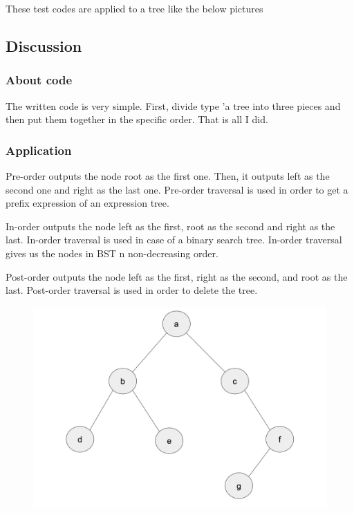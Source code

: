 \documentclass[uplatex,12pt]{jsarticle}
\begin{document}
These test codes are applied to a tree like the below pictures

\vspace{12pt}
\subsection{Discussion}

\subsubsection{About code}
The written code is very simple. First, divide type 'a tree into three pieces and then put them together in the specific order. That is all I did.
\subsubsection{Application}

Pre-order outputs the node root as the first one. Then, it outputs left as the second one and right as the last one. Pre-order traversal is used in order to get a prefix expression of an expression tree.

In-order outputs the node left as the first, root as the second and right as the last. In-order traversal is used in case of a binary search tree. In-order traversal gives us the nodes in BST n non-decreasing order.

Post-order outputs the node left as the first, right as the second, and root as the last. Post-order traversal is used in order to delete the tree.

\begin{figure}[H]
 \includegraphics[scale=0.5] {binarytree.png}
\end{figure}
\end{document}
